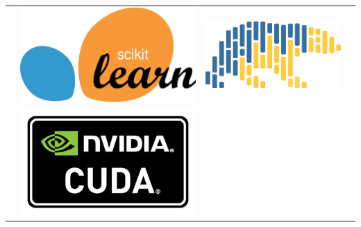 \begin{frame}
\begin{table}[htp]
\begin{tabular}{cccc}
\begin{minipage}{.2\textwidth}
        \end{minipage} 
                                                        & 
        \begin{minipage}{.2\textwidth}
          \includegraphics[width=.9\textwidth]{imagenes/chapter3/Scikit}
        \end{minipage} 
                                                        & 
        \begin{minipage}{.2\textwidth}
          \includegraphics[width=.9\textwidth]{imagenes/chapter3/Polars}
        \end{minipage} 
        &
                                                        \\
                                                        & 
        \begin{minipage}{.2\textwidth}
          \includegraphics[width=.9\textwidth]{imagenes/chapter3/Nvidia}

\end{minipage}
\end{tabular}
\end{table}
\end{frame}
